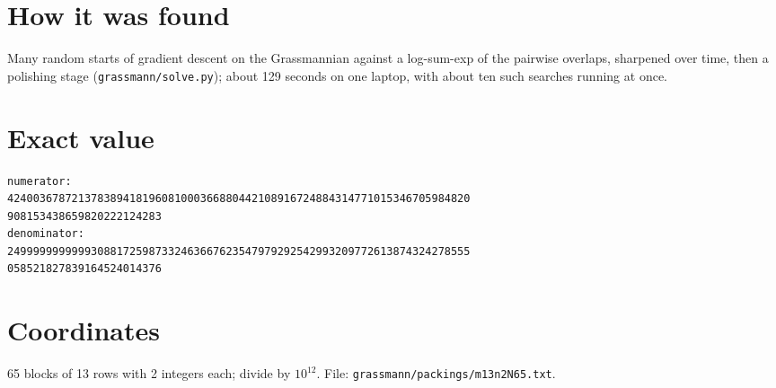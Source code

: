 \documentclass[11pt,a4paper]{article}
\begin{document}
\section{How it was found}
Many random starts of gradient descent on the Grassmannian against a log-sum-exp of the pairwise overlaps, sharpened over time, then a polishing stage (\texttt{grassmann/solve.py}); about 129 seconds on one laptop, with about ten such searches running at once.


\appendix
\section{Exact value}
{\small
\begin{verbatim}
numerator:
424003678721378389418196081000366880442108916724884314771015346705984820
908153438659820222124283
denominator:
249999999999930881725987332463667623547979292542993209772613874324278555
058521827839164524014376
\end{verbatim}}

\section{Coordinates}
65 blocks of 13 rows with 2 integers each; divide by $10^{12}$. File: \texttt{grassmann/packings/m13n2N65.txt}.
{\tiny
\begin{multicols}{4}
\end{multicols}}
\end{document}
